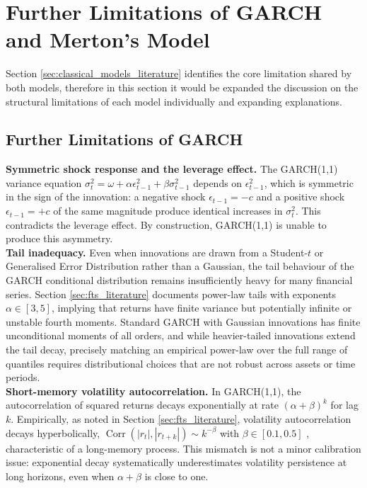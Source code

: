 \section{Further Limitations of GARCH and Merton's Model}
\label{app:sec:limitations}

Section \ref{sec:classical_models_literature} identifies the core limitation shared by both models, therefore in this section it would be expanded the discussion on the structural limitations of each model individually and expanding explanations.

\subsection{Further Limitations of GARCH}

\textbf{Symmetric shock response and the leverage effect.} The GARCH(1,1)
variance equation $\sigma_t^2 = \omega + \alpha\epsilon_{t-1}^2 +
\beta\sigma_{t-1}^2$ depends on $\epsilon_{t-1}^2$, which is symmetric in the
sign of the innovation: a negative shock $\epsilon_{t-1} = -c$ and a positive
shock $\epsilon_{t-1} = +c$ of the same magnitude produce identical increases in
$\sigma_t^2$. This contradicts the leverage effect. By construction, GARCH(1,1) is unable to produce this asymmetry.\\

\textbf{Tail inadequacy.} Even when innovations are drawn from a Student-$t$ or
Generalised Error Distribution rather than a Gaussian, the tail behaviour of the
GARCH conditional distribution remains insufficiently heavy for many financial
series. Section \ref{sec:fts_literature} documents power-law tails with exponents $\alpha \in [3,5]$,
implying that returns have finite variance but potentially infinite or unstable
fourth moments. Standard GARCH with Gaussian innovations has finite unconditional
moments of all orders, and while heavier-tailed innovations extend the tail
decay, precisely matching an empirical power-law over the full range of quantiles
requires distributional choices that are not robust across assets or time
periods.\\

\textbf{Short-memory volatility autocorrelation.} In GARCH(1,1), the
autocorrelation of squared returns decays exponentially at rate
$(\alpha + \beta)^k$ for lag $k$. Empirically, as noted in Section \ref{sec:fts_literature},
volatility autocorrelation decays hyperbolically,
$\operatorname{Corr}(|r_t|, |r_{t+k}|) \sim k^{-\beta}$ with
$\beta \in [0.1, 0.5]$ \cite{cont2001empirical}, characteristic of a
long-memory process. This mismatch is not a minor calibration issue: exponential
decay systematically underestimates volatility persistence at long horizons, even
when $\alpha + \beta$ is close to one.\\

